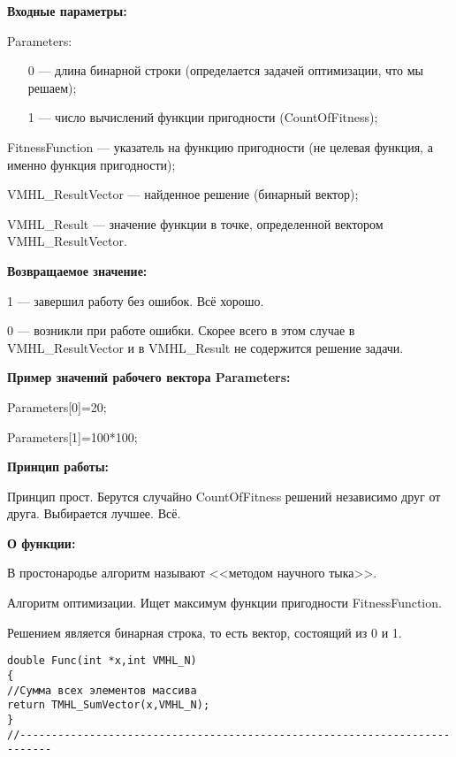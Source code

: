 \documentclass[a4paper,12pt]{article}
\begin{document}
\textbf{Входные параметры:}

 Parameters:
 
 \begin{itemize}
 \item [0] --- длина бинарной строки (определается задачей оптимизации, что мы решаем);
 \item [1] --- число вычислений функции пригодности (CountOfFitness);
 \end{itemize}
  
 FitnessFunction --- указатель на функцию пригодности (не целевая функция, а именно функция пригодности);
 
 VMHL\_ResultVector --- найденное решение (бинарный вектор);
 
 VMHL\_Result --- значение функции в точке, определенной вектором VMHL\_ResultVector.

\textbf{Возвращаемое значение:}
 
 1 --- завершил работу без ошибок. Всё хорошо.
 
 0 --- возникли при работе ошибки. Скорее всего в этом случае в VMHL\_ResultVector и в VMHL\_Result не содержится решение задачи.
 
\textbf{Пример значений рабочего вектора Parameters:}

 Parameters[0]=20;
 
 Parameters[1]=100*100;
 
 \textbf{Принцип работы:}
 
 Принцип прост. Берутся случайно CountOfFitness решений независимо друг от друга. Выбирается лучшее. Всё.
 
 \textbf{ О функции:}
 
 В простонародье алгоритм называют <<методом научного тыка>>.
 
Алгоритм оптимизации. Ищет максимум функции пригодности FitnessFunction.

Решением является бинарная строка, то есть вектор, состоящий из 0 и 1.

\begin{lstlisting}[caption=Оптимизируемая функция]
double Func(int *x,int VMHL_N)
{
//Сумма всех элементов массива
return TMHL_SumVector(x,VMHL_N);
}
//---------------------------------------------------------------------------
\end{lstlisting}
\end{document}
